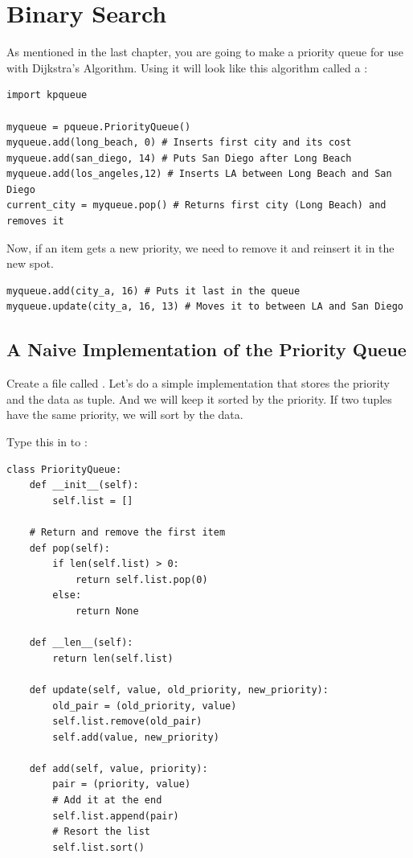 \chapter{Binary Search}

As mentioned in the last chapter, you are going to make a priority
queue for use with Dijkstra's Algorithm. Using it will look like this algorithm called a :

\begin{verbatim}
import kpqueue

myqueue = pqueue.PriorityQueue()
myqueue.add(long_beach, 0) # Inserts first city and its cost
myqueue.add(san_diego, 14) # Puts San Diego after Long Beach
myqueue.add(los_angeles,12) # Inserts LA between Long Beach and San Diego
current_city = myqueue.pop() # Returns first city (Long Beach) and removes it
\end{verbatim}

Now, if an item gets a new priority, we need to remove it and reinsert it in the new spot.
\begin{verbatim}
myqueue.add(city_a, 16) # Puts it last in the queue
myqueue.update(city_a, 16, 13) # Moves it to between LA and San Diego
\end{verbatim}

\section{A Naive Implementation of the Priority Queue}

Create a file called . Let's do a simple
implementation that stores the priority and the data as tuple. And we
will keep it sorted by the priority.  If two tuples have the same
priority, we will sort by the data.

Type this in to :
\begin{verbatim}
class PriorityQueue:
    def __init__(self):
        self.list = []
    
    # Return and remove the first item
    def pop(self):
        if len(self.list) > 0:
            return self.list.pop(0)
        else:
            return None
        
    def __len__(self):
        return len(self.list)

    def update(self, value, old_priority, new_priority):
        old_pair = (old_priority, value)
        self.list.remove(old_pair)
        self.add(value, new_priority)
    
    def add(self, value, priority):
        pair = (priority, value)
        # Add it at the end
        self.list.append(pair)
        # Resort the list
        self.list.sort()
\end{verbatim}

